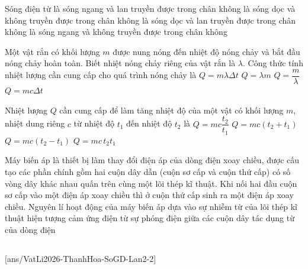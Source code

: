 	\begin{ex}%
		Sóng điện từ
		\choice
		{\True là sóng ngang và lan truyền được trong chân không}
		{là sóng dọc và không truyền được trong chân không}
		{là sóng dọc và lan truyền được trong chân không}
		{là sóng ngang và không truyền được trong chân không}
	\end{ex}

	\begin{ex}%
		Một vật rắn có khối lượng $m$ được nung nóng đến nhiệt độ nóng chảy và bắt đầu nóng chảy hoàn toàn. Biết nhiệt nóng chảy riêng của vật rắn là $\lambda$. Công thức tính nhiệt lượng cần cung cấp cho quá trình nóng chảy là
		\choice
		{$Q=m\lambda\Delta t$}
		{\True $Q=\lambda m$}
		{$Q=\dfrac{m}{\lambda}$}
		{$Q=mc\Delta t$}
	\end{ex}

	\begin{ex}%
		Nhiệt lượng $Q$ cần cung cấp để làm tăng nhiệt độ của một vật có khối lượng $m$, nhiệt dung riêng $c$ từ nhiệt độ $t_1$ đến nhiệt độ $t_2$ là
		\choice
		{$Q=mc\dfrac{t_2}{t_1}$}
		{$Q=mc(t_2+t_1)$}
		{\True $Q=mc(t_2-t_1)$}
		{$Q=mc\,t_2t_1$}
	\end{ex}

	\begin{ex}%
		Máy biến áp là thiết bị làm thay đổi điện áp của dòng điện xoay chiều, được cấu tạo các phần chính gồm hai cuộn dây dẫn (cuộn sơ cấp và cuộn thứ cấp) có số vòng dây khác nhau quấn trên cùng một lõi thép kĩ thuật. Khi nối hai đầu cuộn sơ cấp vào một điện áp xoay chiều thì ở cuộn thứ cấp sinh ra một điện áp xoay chiều. Nguyên lí hoạt động của máy biến áp dựa vào
		\choice
		{sự nhiễm từ của lõi thép kĩ thuật}
		{\True hiện tượng cảm ứng điện từ}
		{sự phóng điện giữa các cuộn dây}
		{tác dụng từ của dòng điện}
	\end{ex}

	\subsection*{}
	\setcounter{ex}{0}
	[ans/VatLi2026-ThanhHoa-SoGD-Lan2-2]

